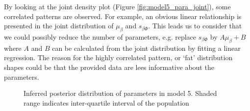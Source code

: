 By looking at the joint density plot (Figure \ref{fig:model5_para_joint}), some correlated patterns are observed. For example, an obvious linear relationship is presented in the joint distribution of $\mu_\beta$ and $s_{\beta\Phi}$. This leads us to consider that we could possibly reduce the number of parameters, e.g. replace $s_{\beta\Phi}$ by $A\mu_\beta+B$ where $A$ and $B$ can be calculated from the joint distribution by fitting a linear regression. The reason for the highly correlated pattern, or `fat' distribution shapes could be that the provided data are lees informative about the parameters.


\begin{figure}[ht]
    \begin{center}
    \end{center}

    \caption[Inferred posterior distribution of parameters in model 5]%
    {Inferred posterior distribution of parameters in model 5. Shaded range indicates inter-quartile  interval of the population}
    \label{fig:model5_para}

\end{figure}

